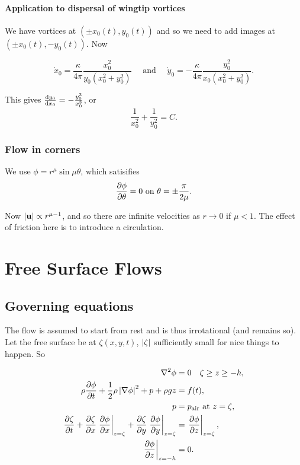 \documentclass{notes}
\newcommand{\grad}{\nabla}
\newcommand{\lapl}{\nabla^2}
\begin{document}
\vspace{1.5in}

\subsubsection*{Application to dispersal of wingtip vortices}

\vspace{1.5in}

We have vortices at $(\pm x_0(t), y_0(t))$ and so we need to add
images at $(\pm x_0(t), -y_0(t))$.  Now

\[
\Dot{x}_0 = \frac{\kappa}{4 \pi} \frac{x_0^2}{y_0(x_0^2 + y_0^2)}
\quad
\text{ and }
\quad
\Dot{y}_0 = -\frac{\kappa}{4 \pi} \frac{y_0^2}{x_0(x_0^2 + y_0^2)}.
\]

This gives $\frac{\mathrm{d} y_0}{\mathrm{d} x_0} = - \frac{y_0^3}{x_0^3}$, or
\[
\frac{1}{x_0^2} + \frac{1}{y_0^2} = C.
\] 

\subsection{Flow in corners}

We use $\phi = r^\mu \sin \mu \theta$, which satisifies
\[
\frac{\partial \phi}{\partial \theta} = 0 \text{ on } \theta = \pm \frac{\pi}{2 \mu}.
\]

\vspace{2in}

Now $\left|\mathbf{u}\right| \propto r^{\mu - 1}$, and so there are infinite
velocities as $r \to 0$ if $\mu < 1$.  The effect of friction here is
to introduce a circulation.

\vspace{1.5in}

\chapter{Free Surface Flows}

\section{Governing equations}

The flow is assumed to start from rest and is thus irrotational (and
remains so).  Let the free surface be at $\zeta(x,y,t)$, $\left|\zeta\right|$
sufficiently small for nice things to happen.  So

\begin{align*}
  \lapl\phi &= 0 \quad \zeta \ge z \ge -h, \\
  \rho \pd{\phi}{t} + \frac{1}{2}\rho \abs{\grad{\phi}}^2 + p +\rho g
  z
  &= f(t), \\
  p &= p_{\text{air}} \text{ at } z = \zeta, \\
  \pd{\zeta}{t} + \pd{\zeta}{x} \left.\pd{\phi}{x}\right|_{z = \zeta} +
  \pd{\zeta}{y} \left.\pd{\phi}{y}\right|_{z = \zeta}
  &= \left.\pd{\phi}{z}\right|_{z = \zeta}, \\
  \left.\pd{\phi}{z}\right|_{z=-h} &= 0.
\end{align*}
\end{document}

